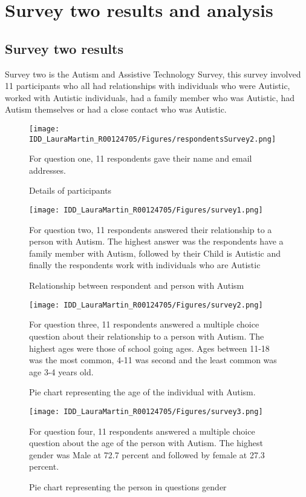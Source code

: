 \chapter{Survey two results and analysis}
\label{chap:Survey two results and analysis}

\section{Survey two results}

Survey two is the Autism and Assistive Technology Survey, this survey involved 11 participants who all had relationships with individuals who were Autistic, worked with Autistic individuals, had a family member who was Autistic, had Autism themselves or had a close contact who was Autistic. 

\begin{figure}[b]
\centering
\texttt{[image: IDD\_LauraMartin\_R00124705/Figures/respondentsSurvey2.png]}
\caption{Details of participants}
{For question one, 11 respondents gave their name and email addresses.}
\end{figure}

\begin{figure}[b]
\centering
\texttt{[image: IDD\_LauraMartin\_R00124705/Figures/survey1.png]}
\caption{Relationship between respondent and person with Autism}
{For question two, 11 respondents answered their relationship to a person with Autism. The highest answer was the respondents have a family member with Autism, followed by their Child is Autistic and finally the respondents work with individuals who are Autistic}
\end{figure}


\begin{figure}[b]
\centering
\texttt{[image: IDD\_LauraMartin\_R00124705/Figures/survey2.png]}
\caption{Pie chart representing the age of the individual with Autism.}
{For question three, 11 respondents answered a multiple choice question about their relationship to a person with Autism. The highest ages were those of school going ages. Ages between 11-18 was the most common, 4-11 was second and the least common was age 3-4 years old.}
\end{figure}


\begin{figure}[b]
\centering
\texttt{[image: IDD\_LauraMartin\_R00124705/Figures/survey3.png]}
\caption{Pie chart representing the person in questions gender}
{For question four, 11 respondents answered a multiple choice question about the age of the person with Autism. The highest gender was Male at 72.7 percent and followed by female at 27.3 percent.}
\end{figure}


